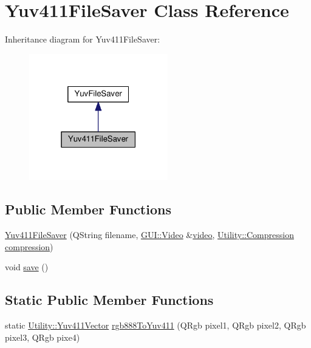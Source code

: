 \hypertarget{classUtility_1_1Yuv411FileSaver}{}\section{Yuv411\+File\+Saver Class Reference}
\label{classUtility_1_1Yuv411FileSaver}


Inheritance diagram for Yuv411\+File\+Saver\+:
\nopagebreak
\begin{figure}[H]
\begin{center}
\leavevmode
\includegraphics[width=171pt]{classUtility_1_1Yuv411FileSaver__inherit__graph}
\end{center}
\end{figure}
\subsection*{Public Member Functions}
\begin{DoxyCompactItemize}
\item 
\hyperlink{classUtility_1_1Yuv411FileSaver_ac06ed657c2deb394946452d19507c5d7}{Yuv411\+File\+Saver} (Q\+String filename, \hyperlink{classGUI_1_1Video}{G\+U\+I\+::\+Video} \&\hyperlink{classUtility_1_1YuvFileSaver_a1c4d4daa00ecea5e8390244e057da0df}{video}, \hyperlink{namespaceUtility_a56a83bf6847f4801f4205eb4be237ccf}{Utility\+::\+Compression} \hyperlink{classUtility_1_1Yuv411FileSaver_aa484ffcb0c9f4d4dea91c6fae73f1fda}{compression})
\item 
void \hyperlink{classUtility_1_1Yuv411FileSaver_aae2c382151ef7c9aa913361172b30db6}{save} ()
\end{DoxyCompactItemize}
\subsection*{Static Public Member Functions}
\begin{DoxyCompactItemize}
\item 
static \hyperlink{classUtility_1_1Yuv411Vector}{Utility\+::\+Yuv411\+Vector} \hyperlink{classUtility_1_1Yuv411FileSaver_aa92efa9b4eb22a7e2afff2e806397524}{rgb888\+To\+Yuv411} (Q\+Rgb pixel1, Q\+Rgb pixel2, Q\+Rgb pixel3, Q\+Rgb pixe4)
\end{DoxyCompactItemize}
